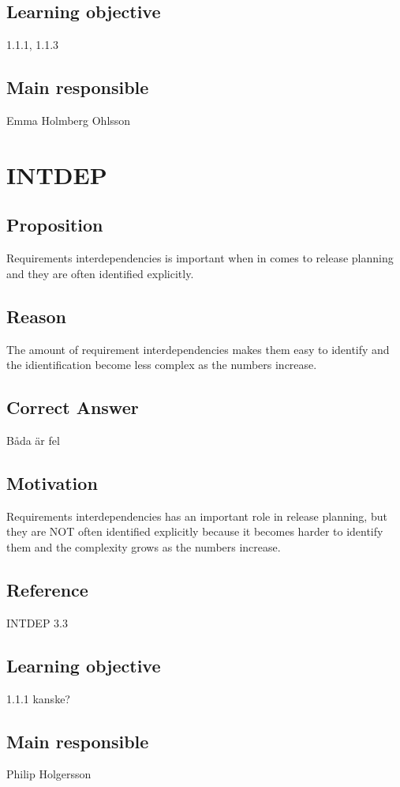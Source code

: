 \documentclass[a4paper]{article}
\begin{document}
\subsection*{Learning objective}
1.1.1, 1.1.3
\subsection*{Main responsible}
Emma Holmberg Ohlsson




\section{INTDEP}
\subsection*{Proposition}
Requirements interdependencies is important when in comes to release planning and they are often identified explicitly.
\subsection*{Reason}
The amount of requirement interdependencies makes them easy to identify and the idientification become less complex as the numbers increase.
\subsection*{Correct Answer}
Båda är fel
\subsection*{Motivation}
Requirements interdependencies has an important role in release planning, but they are NOT often identified explicitly because it becomes harder to identify them and the complexity grows as the numbers increase.
\subsection*{Reference}
INTDEP 3.3
\subsection*{Learning objective}
1.1.1 kanske?
\subsection*{Main responsible}
Philip Holgersson
\end{document}
